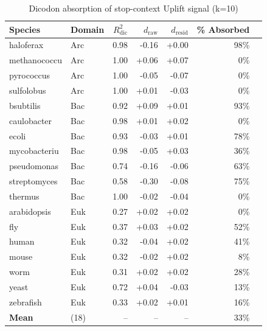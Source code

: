 
\begin{table}[htbp]
\centering
\caption{Dicodon absorption of stop-context Uplift signal (k=10)}
\label{tab:dicodon_absorption}
\begin{tabular}{llrrrrr}
\toprule
Species & Domain & $R^2_{\mathrm{dic}}$ & $d_{\mathrm{raw}}$ & $d_{\mathrm{resid}}$ & \% Absorbed \\
\midrule
haloferax & Arc & 0.98 & -0.16 & +0.00 & 98\% \\
methanococcu & Arc & 1.00 & +0.06 & +0.07 & 0\% \\
pyrococcus & Arc & 1.00 & -0.05 & -0.07 & 0\% \\
sulfolobus & Arc & 1.00 & +0.01 & -0.03 & 0\% \\
bsubtilis & Bac & 0.92 & +0.09 & +0.01 & 93\% \\
caulobacter & Bac & 0.98 & +0.01 & +0.02 & 0\% \\
ecoli & Bac & 0.93 & -0.03 & +0.01 & 78\% \\
mycobacteriu & Bac & 0.98 & -0.05 & +0.03 & 36\% \\
pseudomonas & Bac & 0.74 & -0.16 & -0.06 & 63\% \\
streptomyces & Bac & 0.58 & -0.30 & -0.08 & 75\% \\
thermus & Bac & 1.00 & -0.02 & -0.04 & 0\% \\
arabidopsis & Euk & 0.27 & +0.02 & +0.02 & 0\% \\
fly & Euk & 0.37 & +0.03 & +0.02 & 52\% \\
human & Euk & 0.32 & -0.04 & +0.02 & 41\% \\
mouse & Euk & 0.32 & -0.02 & +0.02 & 8\% \\
worm & Euk & 0.31 & +0.02 & +0.02 & 28\% \\
yeast & Euk & 0.72 & +0.04 & -0.03 & 13\% \\
zebrafish & Euk & 0.33 & +0.02 & +0.01 & 16\% \\
\midrule
\textbf{Mean} & (18) & -- & -- & -- & 33\% \\
\bottomrule
\end{tabular}
\end{table}